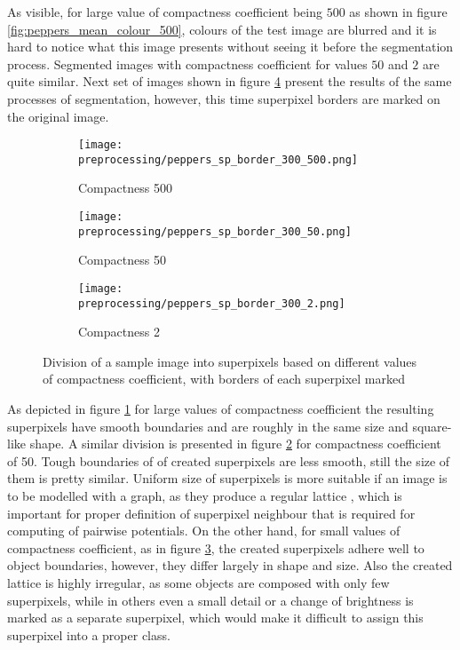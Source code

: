 As visible, for large value of compactness coefficient being $500$ as shown in figure \ref{fig:peppers_mean_colour_500}, colours of the test image are blurred and it is hard to notice what this image presents without seeing it before the segmentation process. Segmented images with compactness coefficient for values $50$ and $2$ are quite similar.
Next set of images shown in figure \ref{fig:peppers_boundaries} present the results of the same processes of segmentation, however, this time superpixel borders are marked on the original image.
\begin{figure}[h]
 \centering
  \begin{subfigure}[h]{0.32\textwidth}
    \texttt{[image: preprocessing/peppers\_sp\_border\_300\_500.png]}
    \caption{Compactness 500}
    \label{fig:peppers_boundaries_500}
  \end{subfigure}
  \begin{subfigure}[h]{0.32\textwidth}
    \texttt{[image: preprocessing/peppers\_sp\_border\_300\_50.png]}
    \caption{Compactness 50}
    \label{fig:peppers_boundaries_50}
  \end{subfigure}
    \begin{subfigure}[h]{0.32\textwidth}
    \texttt{[image: preprocessing/peppers\_sp\_border\_300\_2.png]}
    \caption{Compactness 2}
    \label{fig:peppers_boundaries_2}
  \end{subfigure}
     \caption{Division of a sample image into superpixels based on different values of compactness coefficient, with borders of each superpixel marked}%
    \label{fig:peppers_boundaries}       
\end{figure}
As depicted in figure \ref{fig:peppers_boundaries_500} for large values of compactness coefficient the resulting superpixels have smooth boundaries and are roughly in the same size and square-like shape. A similar division is presented in figure \ref{fig:peppers_boundaries_50} for compactness coefficient of 50. Tough boundaries of of created superpixels are less smooth, still the size of them is pretty similar. Uniform size of superpixels is more suitable if an image is to be modelled with a graph, as they produce a regular lattice \cite{superpixels_compactness}, which is important for proper definition of superpixel neighbour that is required for computing of pairwise potentials. On the other hand, for small values of compactness coefficient, as in figure \ref{fig:peppers_boundaries_2}, the created superpixels adhere well to object boundaries, however, they differ largely in shape and size. Also the created lattice is highly irregular, as some objects are composed with only few superpixels, while in others even a small detail or a change of brightness is marked as a separate superpixel, which would make it difficult to assign this superpixel into a proper class.
